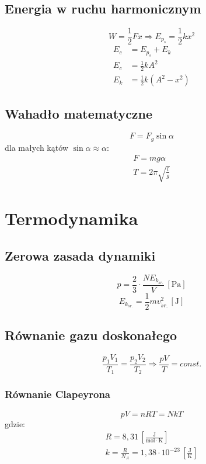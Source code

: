 \documentclass{article}
\numberwithin{equation}{section}
\newcommand{\unit}[1]{\, \left[\mathrm{#1}\right]}
\begin{document}
    \subsection{Energia w ruchu harmonicznym}
      \begin{equation}
        W = \frac{1}{2}Fx \Rightarrow E_{p_s} = \frac{1}{2}kx^2
      \end{equation}
      \begin{align}
        E_c &= E_{p_s} + E_k\\
        E_c &= \frac{1}{2}kA^2\\
        E_k &= \frac{1}{2}k(A^2 - x^2)
      \end{align}
    \subsection{Wahadło matematyczne}
      \begin{equation}
        F = F_g\sin\alpha
      \end{equation}
      dla małych kątów $\sin\alpha\approx\alpha$:
      \begin{gather}
        F = mg\alpha\\
        T = 2\pi\sqrt{\frac lg}
      \end{gather}

  \newpage
  \section{Termodynamika}
    \subsection{Zerowa zasada dynamiki}
      \begin{equation}
        p = \frac{2}{3}\cdot\frac{NE_{k_{\acute sr.}}}{V} \unit{Pa}
      \end{equation}
      \begin{equation}
        E_{k_{\acute sr.}} = \frac{1}{2}mv_{\acute sr.}^2 \unit{J}
      \end{equation}
    \subsection{Równanie gazu doskonałego}
      \begin{equation}
        \frac{p_1V_1}{T_1} = \frac{p_2V_2}{T_2} \Rightarrow \frac{pV}{T} = const.
      \end{equation}
      \subsubsection{Równanie Clapeyrona}
        \begin{equation}
          pV = nRT = NkT
        \end{equation}
        gdzie:
        \begin{gather}
          R =  8,31 \unit{\frac{J}{mol\cdot K}}\\
          k = \frac{R}{N_A} = 1,38\cdot 10^{-23} \unit{\frac{J}{K}}
        \end{gather}
\end{document}
